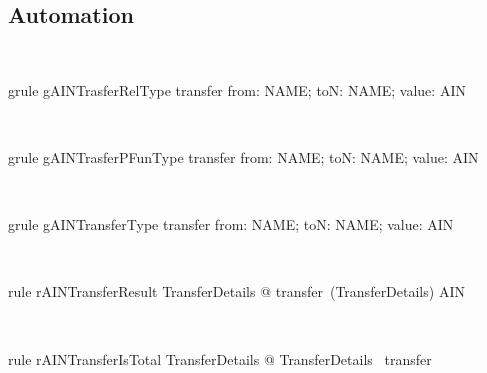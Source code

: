 \subsection*{Automation}

\begin{LGRT}
~\end{LGRT}

\begin{LGRT}
\begin{theorem}{grule gAINTrasferRelType}
    transfer \in  \lblot from: NAME; toN: NAME; value: \nat \rblot  \rel  AIN
\end{theorem}~\end{LGRT}

\begin{LGRT}
\begin{theorem}{grule gAINTrasferPFunType}
    transfer \in  \lblot from: NAME; toN: NAME; value: \nat \rblot  \pfun  AIN
\end{theorem}~\end{LGRT}

\begin{LGRT}
\begin{theorem}{grule gAINTransferType}
    transfer \in  \lblot from: NAME; toN: NAME; value: \nat \rblot  \pinj  AIN
\end{theorem}~\end{LGRT}

\begin{LRRT}
\begin{theorem}{rule rAINTransferResult}
    \forall  TransferDetails @ transfer~(\theta  TransferDetails) \in  AIN
\end{theorem}~\end{LRRT}

\begin{LRRT}
\begin{theorem}{rule rAINTransferIsTotal}
    \forall  TransferDetails @ \theta  TransferDetails \in  \dom~transfer
\end{theorem}~\end{LRRT}

